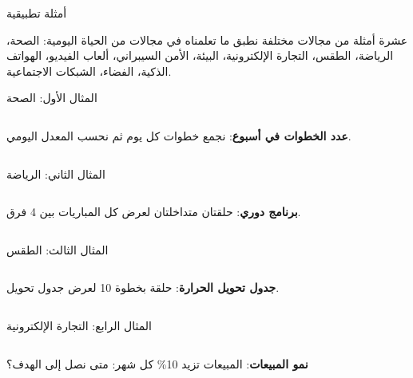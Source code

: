 \begin{frame}{أمثلة تطبيقية}
    \begin{tbox}{\faLaptopCode\quad عشرة أمثلة من مجالات مختلفة}
        نطبق ما تعلمناه في مجالات من الحياة اليومية:
        الصحة، الرياضة، الطقس، التجارة الإلكترونية، البيئة، الأمن السيبراني، ألعاب الفيديو، الهواتف الذكية، الفضاء، الشبكات الاجتماعية.
    \end{tbox}
\end{frame}

\begin{frame}[t]{المثال الأول: الصحة}
    \begin{columns}[T]
        {\small\textbf{عدد الخطوات في أسبوع}: نجمع خطوات كل يوم ثم نحسب المعدل اليومي.\par}
        \vspace{0.3cm}
    \end{columns}
\end{frame}

\begin{frame}[t]{المثال الثاني: الرياضة}
    \begin{columns}[T]
        {\small\textbf{برنامج دوري}: حلقتان متداخلتان لعرض كل المباريات بين 4 فرق.\par}
        \vspace{0.3cm}
    \end{columns}
\end{frame}

\begin{frame}[t]{المثال الثالث: الطقس}
    \begin{columns}[T]
        {\small\textbf{جدول تحويل الحرارة}: حلقة  بخطوة 10 لعرض جدول تحويل.\par}
        \vspace{0.3cm}
    \end{columns}
\end{frame}

\begin{frame}[t]{المثال الرابع: التجارة الإلكترونية}
    \begin{columns}[T]
        {\small\textbf{نمو المبيعات}: المبيعات تزيد 10\% كل شهر: متى نصل إلى الهدف؟\par}
        \vspace{0.3cm}
    \end{columns}
\end{frame}

